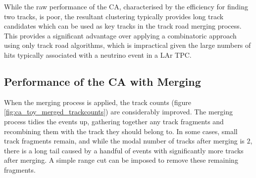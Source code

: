 
While the raw performance of the \ac{CA}, characterised by the efficiency for finding two tracks, is poor, the resultant clustering typically provides long track candidates which can be used as key tracks in the track road merging process. This provides a significant advantage over applying a combinatoric approach using only track road algorithms, which is impractical given the large numbers of hits typically associated with a neutrino event in a \ac{LAr TPC}.

\subsection{Performance of the \acl{CA} with Merging}
When the merging process is applied, the track counts (figure \ref{fig:ca_toy_merged_trackcounts}) %
are considerably improved. The merging process tidies the events up, gathering together any track fragments and recombining them with the track they should belong to. In some cases, small track fragments remain, and while the modal number of tracks after merging is $2$, there is a long tail caused by a handful of events with significantly more tracks after merging. A simple range cut can be imposed to remove these remaining fragments.

